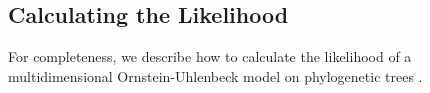 \documentclass[11pt,a4paper]{article}
\begin{document}



\subsection{Calculating the Likelihood}
For completeness, we describe how to calculate the likelihood of a multidimensional Ornstein-Uhlenbeck model on phylogenetic trees \citep{felsenstein1988phylogenies,hansen1997stabilizing, blackwell2003bayesian}.
\end{document}
